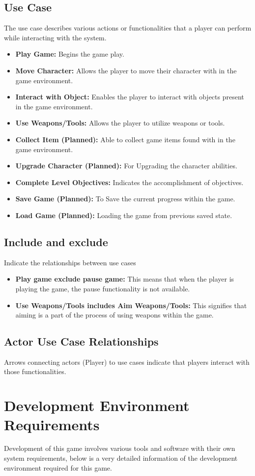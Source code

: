 \subsection{Use Case}
The use case describes various actions or functionalities that a player can perform while interacting with the system.
\begin{itemize}
	\item \textbf{Play Game:} Begins the game play.
	\item \textbf{Move Character:} Allows the player to move their character with in the game environment.
	\item \textbf{Interact with Object:} Enables the player to interact with objects present in the game environment.
	\item \textbf{Use Weapons/Tools:} Allows the player to utilize weapons or tools.
	\item \textbf{Collect Item (Planned):} Able to collect game items found with in the game environment.
	\item \textbf{Upgrade Character (Planned):} For Upgrading the character abilities.
	\item \textbf{Complete Level Objectives:} Indicates the accomplishment of objectives.
	\item \textbf{Save Game (Planned):} To Save the current progress within the game.
	\item \textbf{Load Game (Planned):} Loading the game from previous saved state.
\end{itemize}
\subsection{Include and exclude}Indicate the relationships between use cases
\begin{itemize}
	\item \textbf{Play game exclude pause game:} This means that when the player is playing the game, the pause functionality is not available.
	\item \textbf{Use Weapons/Tools includes Aim Weapons/Tools:} This signifies that aiming is a part of the process of using weapons within the game.
\end{itemize}
\subsection{Actor Use Case Relationships}
Arrows connecting actors (Player) to use cases indicate that players interact with those functionalities.
\section{Development Environment Requirements}
Development of this game involves various tools and software with their own system requirements, below is a very detailed information of the development environment required for this game.
